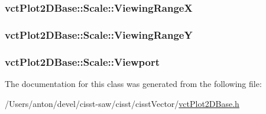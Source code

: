 \subsubsection[{Viewing\+Range\+X}]{ vct\+Plot2\+D\+Base\+::\+Scale\+::\+Viewing\+Range\+X\hspace{0.3cm}{\ttfamily [protected]}}\label{classvct_plot2_d_base_1_1_scale_a9d017bf27e0f5cef7a916acb0c5b9638}
\hypertarget{classvct_plot2_d_base_1_1_scale_accd0d96ac002b90cabd39bcd3bcc4ee4}{}
\subsubsection[{Viewing\+Range\+Y}]{ vct\+Plot2\+D\+Base\+::\+Scale\+::\+Viewing\+Range\+Y\hspace{0.3cm}{\ttfamily [protected]}}\label{classvct_plot2_d_base_1_1_scale_accd0d96ac002b90cabd39bcd3bcc4ee4}
\hypertarget{classvct_plot2_d_base_1_1_scale_a3ad0dc662565feaa26046ab15b40efb1}{}
\subsubsection[{Viewport}]{ vct\+Plot2\+D\+Base\+::\+Scale\+::\+Viewport\hspace{0.3cm}{\ttfamily [protected]}}\label{classvct_plot2_d_base_1_1_scale_a3ad0dc662565feaa26046ab15b40efb1}


The documentation for this class was generated from the following file\+:\begin{DoxyCompactItemize}
\item 
/\+Users/anton/devel/cisst-\/saw/cisst/cisst\+Vector/\hyperlink{vct_plot2_d_base_8h}{vct\+Plot2\+D\+Base.\+h}\end{DoxyCompactItemize}
